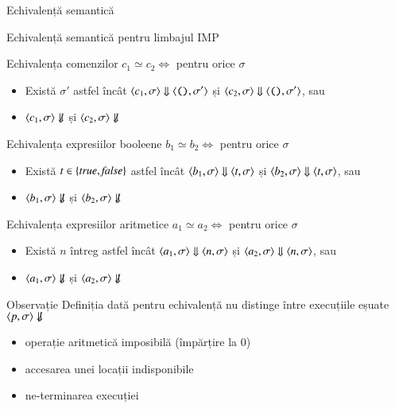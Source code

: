 \begin{section}{Echivalență semantică}
\begin{frame}{Echivalență semantică pentru limbajul IMP}
\begin{block}{Echivalența comenzilor} 
$c_1\simeq c_2 \iff {}$ pentru orice $\sigma$   
\begin{itemize}
\item Există $\sigma'$ astfel încât $\displaystyle{\ensuremath {{\langle{c_1,\sigma}\rangle}} \Downarrow {{\ensuremath \langle{\ensuremath\mathrel{\text{\ttfamily ()}}, \sigma'}\rangle}}}$ și $\displaystyle{\ensuremath {{\langle{c_2,\sigma}\rangle}} \Downarrow {{\ensuremath \langle{\ensuremath\mathrel{\text{\ttfamily ()}}, \sigma'}\rangle}}}$, sau
\item ${\langle{c_1,\sigma}\rangle} \not\Downarrow$ și  ${\langle{c_2,\sigma}\rangle} \not\Downarrow$ 
\end{itemize}
\end{block}
\vfill
\begin{block}{Echivalența expresiilor booleene} 
$b_1\simeq b_2 \iff {}$ pentru orice $\sigma$   
\begin{itemize}
\item Există $t\in\{{\it true}, {\it false}\}$ astfel încât $\displaystyle{\ensuremath {{\langle{b_1,\sigma}\rangle}} \Downarrow {{\ensuremath \langle{t, \sigma}\rangle}}}$ și $\displaystyle{\ensuremath {{\langle{b_2,\sigma}\rangle}} \Downarrow {{\ensuremath \langle{t, \sigma}\rangle}}}$, sau
\item ${\langle{b_1,\sigma}\rangle} \not\Downarrow$ și  ${\langle{b_2,\sigma}\rangle} \not\Downarrow$ 
\end{itemize}
\end{block}
\vfill
\begin{block}{Echivalența expresiilor aritmetice} 
$a_1\simeq a_2 \iff {}$ pentru orice $\sigma$   
\begin{itemize}
\item Există $n$ întreg astfel încât $\displaystyle{\ensuremath {{\langle{a_1,\sigma}\rangle}} \Downarrow {{\ensuremath \langle{n, \sigma}\rangle}}}$ și $\displaystyle{\ensuremath {{\langle{a_2,\sigma}\rangle}} \Downarrow {{\ensuremath \langle{n, \sigma}\rangle}}}$, sau
\item ${\langle{a_1,\sigma}\rangle} \not\Downarrow$ și  ${\langle{a_2,\sigma}\rangle} \not\Downarrow$ 
\end{itemize}
\end{block}

\end{frame}


\begin{frame}{}
\begin{block}{Observație}
Definiția dată pentru echivalență nu distinge între execuțiile eșuate ${\langle{p,\sigma}\rangle}\not\Downarrow$
\begin{itemize}
\item operație aritmetică imposibilă (împărțire la 0)
\item accesarea unei locații indisponibile
\item ne-terminarea execuției
\end{itemize}
\end{block}


\end{frame}
\end{section}
